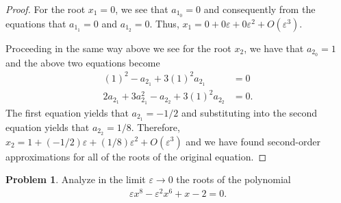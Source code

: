 \documentclass[12pt]{article}
\theoremstyle{definition}
\newtheorem{problem}{Problem}
\begin{document}
\begin{proof}
  For the root $x_1 = 0$, we see that $a_{1_0} = 0$ and consequently from the equations that $a_{1_1} = 0$ and $a_{1_2} = 0$. Thus,
  $x_1 = 0 + 0\varepsilon + 0\varepsilon^2 + O(\varepsilon^3)$.

  Proceeding in the same way above we see for the root $x_2$, we have that $a_{2_0} = 1$ and the above two
  equations become
  \begin{align*}
    (1)^2  -a_{2_1} + 3(1)^2a_{2_1} &= 0 \\
    2a_{2_1} + 3a_{2_1}^2 - a_{2_2} + 3(1)^2a_{2_2} &= 0.
  \end{align*}
  The first equation yields that $a_{2_1} = -1/2$ and substituting into the second
  equation yields that $a_{2_2} = 1/8$. Therefore,   $x_2 = 1 + (-1/2)\varepsilon + (1/8)\varepsilon^2 + O(\varepsilon^3)$
  and we have found second-order approximations for all of the roots of the original equation.


\end{proof}
\newpage


\begin{problem}
  Analyze in the limit $\varepsilon \to 0$ the roots of the polynomial
  \begin{align*}
    \varepsilon x^8 - \varepsilon^2 x^6 + x -2 = 0.
  \end{align*}
\end{problem}
\end{document}
